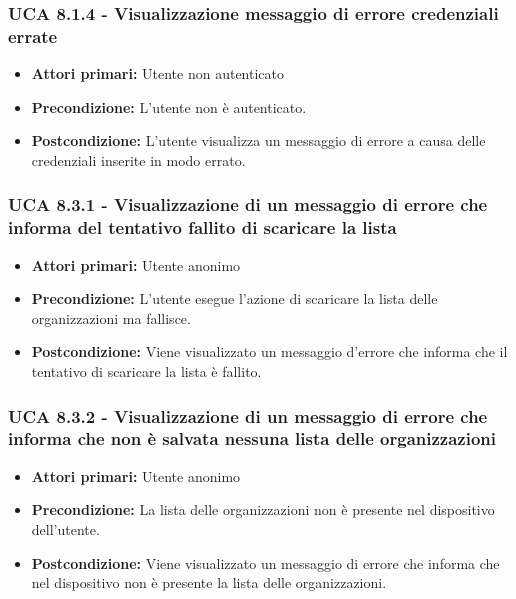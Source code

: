 \subsubsection{UCA 8.1.4 - Visualizzazione messaggio di errore credenziali errate}%
\begin{itemize}
    \item \textbf{Attori primari:} Utente non autenticato
    \item \textbf{Precondizione:}  L'utente non è autenticato.
    \item \textbf{Postcondizione:} L'utente visualizza un messaggio di errore a causa delle credenziali inserite in modo errato.
\end{itemize}

\subsubsection{UCA 8.3.1 - Visualizzazione di un messaggio di errore che informa del tentativo fallito di scaricare la lista}%
\begin{itemize}
\item \textbf{Attori primari:} Utente anonimo
\item \textbf{Precondizione:} L'utente esegue l'azione di scaricare la lista delle organizzazioni ma fallisce.
\item \textbf{Postcondizione:} Viene visualizzato un messaggio d'errore che informa che il tentativo di scaricare la lista è fallito.

\end{itemize}

\subsubsection{UCA 8.3.2 - Visualizzazione di un messaggio di errore che informa che non è salvata nessuna lista delle organizzazioni}%
\begin{itemize}
	\item \textbf{Attori primari:} Utente anonimo
	\item \textbf{Precondizione:} La lista delle organizzazioni non è presente nel dispositivo dell'utente.
	\item \textbf{Postcondizione:} Viene visualizzato un messaggio di errore che informa che nel dispositivo non è presente la lista delle organizzazioni.
\end{itemize}

